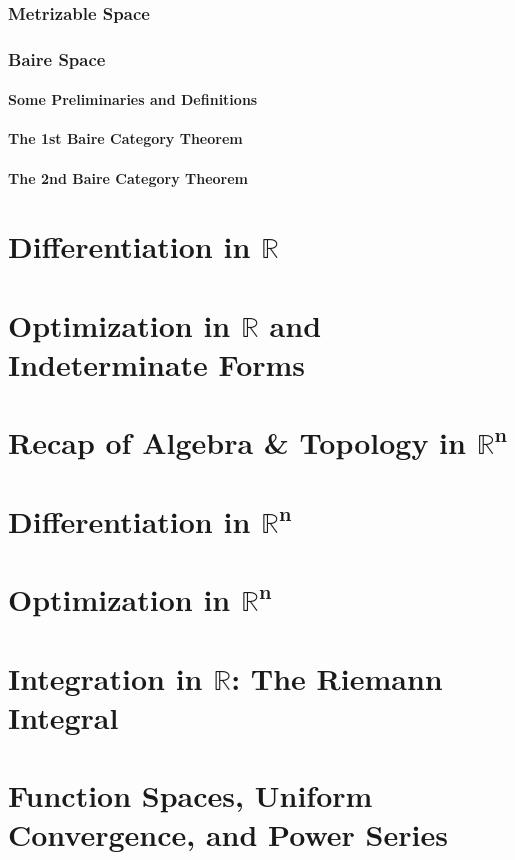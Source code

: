 \subsection{Metrizable Space}
\subsection{Baire Space}
\subsubsection{Some Preliminaries and Definitions}
\subsubsection{The 1st Baire Category Theorem}
\subsubsection{The 2nd Baire Category Theorem}
\chapter{Differentiation in \texorpdfstring{$\pmb{\mathbb{R}}$}{R}}
\chapter{Optimization in \texorpdfstring{$\pmb{\mathbb{R}}$}{R} and Indeterminate Forms}
\chapter{Recap of Algebra \& Topology in \texorpdfstring{$\pmb{\mathbb{R}^n}$}{Rn}}
\section{}
\chapter{Differentiation in \texorpdfstring{$\pmb{\mathbb{R}^n}$}{Rn}}
\chapter{Optimization in \texorpdfstring{$\pmb{\mathbb{R}^n}$}{Rn}}
\chapter{Integration in \texorpdfstring{$\pmb{\mathbb{R}}$}{R}: The Riemann Integral}
\chapter{Function Spaces, Uniform Convergence, and Power Series}
